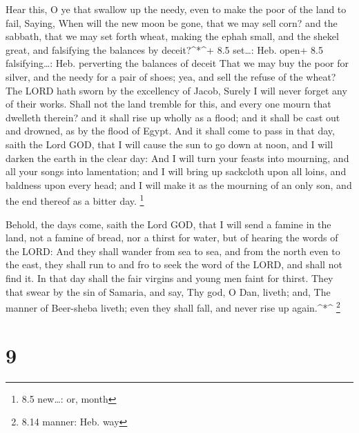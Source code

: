  Hear this, O ye that swallow up the needy, even to make the
poor of the land to fail,  Saying, When will the new moon be
gone, that we may sell corn? and the sabbath, that we may set forth
wheat, making the ephah small, and the shekel great, and falsifying the
balances by deceit?\^{}*\^{}+ 8.5 set\ldots: Heb. open+ 8.5
falsifying\ldots: Heb. perverting the balances of deceit 
That we may buy the poor for silver, and the needy for a pair of shoes;
yea, and sell the refuse of the wheat?  The LORD hath sworn
by the excellency of Jacob, Surely I will never forget any of their
works.  Shall not the land tremble for this, and every one
mourn that dwelleth therein? and it shall rise up wholly as a flood; and
it shall be cast out and drowned, as by the flood of Egypt. 
And it shall come to pass in that day, saith the Lord GOD, that I will
cause the sun to go down at noon, and I will darken the earth in the
clear day:  And I will turn your feasts into mourning, and
all your songs into lamentation; and I will bring up sackcloth upon all
loins, and baldness upon every head; and I will make it as the mourning
of an only son, and the end thereof as a bitter day. \footnote{8.5
  new\ldots: or, month}

 Behold, the days come, saith the Lord GOD, that I will
send a famine in the land, not a famine of bread, nor a thirst for
water, but of hearing the words of the LORD:  And they
shall wander from sea to sea, and from the north even to the east, they
shall run to and fro to seek the word of the LORD, and shall not find
it.  In that day shall the fair virgins and young men faint
for thirst.  They that swear by the sin of Samaria, and
say, Thy god, O Dan, liveth; and, The manner of Beer-sheba liveth; even
they shall fall, and never rise up again.\^{}*\^{} \footnote{8.14
  manner: Heb. way}

\hypertarget{section-8}{%
\section{9}\label{section-8}}

